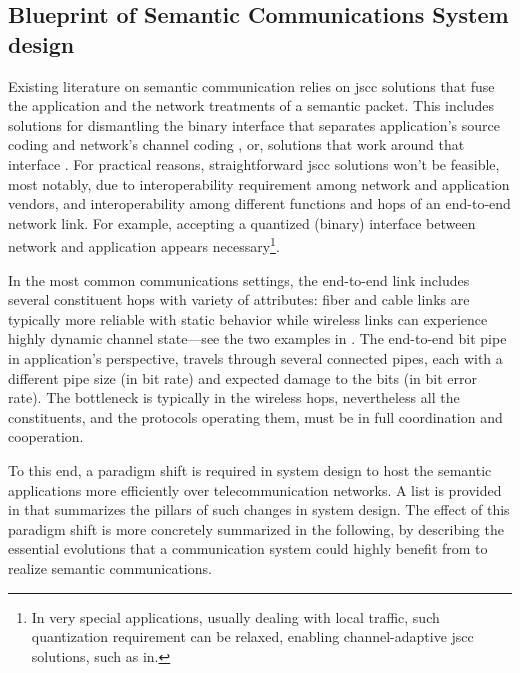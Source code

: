 \subsection{Blueprint of Semantic Communications System design}

Existing literature on semantic communication  relies on  \gls{jscc} solutions that fuse the application and the network treatments of a semantic packet. This includes solutions for dismantling   the   binary interface  that separates application's source coding and network's channel coding \cite{bourtsoulatze19_deep_joint_sourc_chann_codin}, or, solutions that  work around that interface \cite{tung2024multilevelreliabilityinterfacesemantic}. For  practical reasons, straightforward \gls{jscc} solutions  won't be feasible, most notably,  due to interoperability requirement among network and application vendors, and interoperability among different functions and hops of an end-to-end network link. For example, accepting a quantized (binary) interface between network and application %
appears necessary\footnote{In very special applications, usually dealing with local traffic,  such  quantization requirement can be relaxed, enabling channel-adaptive \gls{jscc} solutions, such as in\cite{bourtsoulatze19_deep_joint_sourc_chann_codin}.}.

In the most common communications settings,  the end-to-end link includes several constituent hops with variety of attributes: fiber and cable links are typically more reliable with static behavior while wireless links can experience highly dynamic channel state---see the two examples in . The end-to-end bit pipe in application's perspective,  travels through several connected pipes, each with a different pipe size (in bit rate) and expected  damage to the bits (in bit error rate). The bottleneck is typically in the wireless hops, nevertheless all the  constituents, and the protocols operating them, must be in full coordination and cooperation. 


To this end, a paradigm shift is required in system design to host the semantic applications more efficiently over telecommunication networks. A list is provided in  that summarizes  the pillars of such   changes in system design. The effect of this paradigm shift is more concretely summarized in the following, by describing the essential evolutions that a  communication system could highly benefit from to realize semantic communications.





